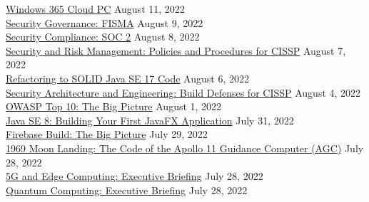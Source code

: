 \documentclass[10pt]{res} %
\begin{document}
\begin{resume}
\href{https://bjdelacruz.dev/files/certificates/pluralsight/Windows_365_Cloud_PC.pdf}{\color{blue}Windows 365 Cloud PC} \hfill August 11, 2022 \\
\href{https://bjdelacruz.dev/files/certificates/pluralsight/Security_Governance_FISMA.pdf}{\color{blue}Security Governance: FISMA} \hfill August 9, 2022 \\
\href{https://bjdelacruz.dev/files/certificates/pluralsight/Security_Compliance_SOC_2.pdf}{\color{blue}Security Compliance: SOC 2} \hfill August 8, 2022 \\
\href{https://bjdelacruz.dev/files/certificates/pluralsight/2_Security_and_Risk_Management_Policies_and_Procedures_for_CISSP.pdf}{\color{blue}Security and Risk Management: Policies and Procedures for CISSP\textsuperscript{\textregistered}} \hfill August 7, 2022 \\
\href{https://bjdelacruz.dev/files/certificates/pluralsight/Refactoring_to_SOLID_Java_SE_17_Code.pdf}{\color{blue}Refactoring to SOLID Java SE 17 Code} \hfill August 6, 2022 \\
\href{https://bjdelacruz.dev/files/certificates/pluralsight/5_Security_Architecture_and_Engineering_Build_Defenses_for_CISSP.pdf}{\color{blue}Security Architecture and Engineering: Build Defenses for CISSP\textsuperscript{\textregistered}} \hfill August 4, 2022 \\
\href{https://bjdelacruz.dev/files/certificates/pluralsight/OWASP_Top_10_-_The_Big_Picture.pdf}{\color{blue}OWASP Top 10: The Big Picture} \hfill August 1, 2022 \\
\href{https://bjdelacruz.dev/files/certificates/pluralsight/Java_SE_8_Building_Your_First_JavaFX_Application.pdf}{\color{blue}Java SE 8: Building Your First JavaFX Application} \hfill July 31, 2022 \\
\href{https://bjdelacruz.dev/files/certificates/pluralsight/Firebase_Build_The_Big_Picture.pdf}{\color{blue}Firebase Build: The Big Picture} \hfill July 29, 2022 \\
\href{https://bjdelacruz.dev/files/certificates/pluralsight/1969_Moon_Landing_The_Code_of_the_Apollo_11_Guidance_Computer_AGC.pdf}{\color{blue}1969 Moon Landing: The Code of the Apollo 11 Guidance Computer (AGC)} \hfill July 28, 2022 \\
\href{https://bjdelacruz.dev/files/certificates/pluralsight/5G_and_Edge_Computing_Executive_Briefing.pdf}{\color{blue}5G and Edge Computing: Executive Briefing} \hfill July 28, 2022 \\
\href{https://bjdelacruz.dev/files/certificates/pluralsight/Quantum_Computing_Executive_Briefing.pdf}{\color{blue}Quantum Computing: Executive Briefing} \hfill July 28, 2022 \\

\end{resume}
\end{document}
